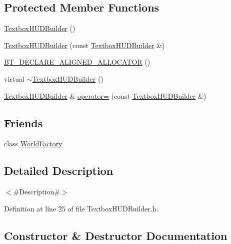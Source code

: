 \subsection*{Protected Member Functions}
\begin{DoxyCompactItemize}
\item 
\mbox{\hyperlink{classnjli_1_1_textbox_h_u_d_builder_a28ac1b244ed9cdc522094f7a21179705}{Textbox\+H\+U\+D\+Builder}} ()
\item 
\mbox{\hyperlink{classnjli_1_1_textbox_h_u_d_builder_a3cd77b395d1e5a1f5d98702b3c5aa8b9}{Textbox\+H\+U\+D\+Builder}} (const \mbox{\hyperlink{classnjli_1_1_textbox_h_u_d_builder}{Textbox\+H\+U\+D\+Builder}} \&)
\item 
\mbox{\hyperlink{classnjli_1_1_textbox_h_u_d_builder_a6eb96d9b8d9d5e9fc8122b43739c4a1c}{B\+T\+\_\+\+D\+E\+C\+L\+A\+R\+E\+\_\+\+A\+L\+I\+G\+N\+E\+D\+\_\+\+A\+L\+L\+O\+C\+A\+T\+OR}} ()
\item 
virtual \mbox{\hyperlink{classnjli_1_1_textbox_h_u_d_builder_addb6ef583f79683307283cda1aa39c1f}{$\sim$\+Textbox\+H\+U\+D\+Builder}} ()
\item 
\mbox{\hyperlink{classnjli_1_1_textbox_h_u_d_builder}{Textbox\+H\+U\+D\+Builder}} \& \mbox{\hyperlink{classnjli_1_1_textbox_h_u_d_builder_af73289cced2b3da90c4de8801d5c2246}{operator=}} (const \mbox{\hyperlink{classnjli_1_1_textbox_h_u_d_builder}{Textbox\+H\+U\+D\+Builder}} \&)
\end{DoxyCompactItemize}
\subsection*{Friends}
\begin{DoxyCompactItemize}
\item 
class \mbox{\hyperlink{classnjli_1_1_textbox_h_u_d_builder_acb96ebb09abe8f2a37a915a842babfac}{World\+Factory}}
\end{DoxyCompactItemize}


\subsection{Detailed Description}
$<$\#\+Description\#$>$ 

Definition at line 25 of file Textbox\+H\+U\+D\+Builder.\+h.



\subsection{Constructor \& Destructor Documentation}
\mbox{\label{classnjli_1_1_textbox_h_u_d_builder_a28ac1b244ed9cdc522094f7a21179705}} 
